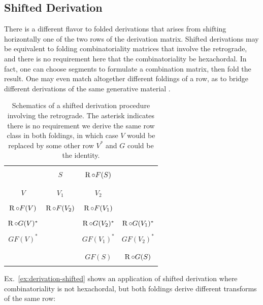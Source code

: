 \subsection{Shifted Derivation}

There is a different flavor to folded derivations that arises from shifting horizontally one of the two rows of the derivation matrix. Shifted derivations may be equivalent to folding combinatoriality matrices that involve the retrograde, and there is no requirement here that the combinatoriality be hexachordal. In fact, one can choose segments to formulate a combination matrix, then fold the result. One may even match altogether different foldings of a row, as to bridge different derivations of the same generative material \cite[216]{Starr1984}.

\begin{table}[htbp]
    \caption[Shifted Derivation Involving the Retrograde]{Schematics of a shifted derivation procedure involving the retrograde. The asterisk indicates there is no requirement we derive the same row class in both foldings, in which case $V$ would be replaced by some other row $V^*$ and $G$ could be the identity.}
    \label{derivation-shifted}
    \centering
    \vspace{12pt}
    \begin{tabular}{ c | c c c }
        \hline\\
        & $S$ & $\operatorname{R} \circ F(S)$ & \\\\
        \hline\\
        $V$ & $V_1$ & $V_2$ & \\\\
        $\operatorname{R} \circ F(V)$ & $\operatorname{R} \circ F(V_2)$ & $\operatorname{R} \circ F(V_1)$ & \\\\
        $\operatorname{R} \circ G(V)^*$ && $\operatorname{R} \circ G(V_2)^*$ & $\operatorname{R} \circ G(V_1)^*$ \\\\
        $GF(V)^*$ && $GF(V_1)^*$ & $GF(V_2)^*$ \\\\
        \hline\\
        && $GF(S)$ & $\operatorname{R} \circ G(S)$ \\\\
        \hline
    \end{tabular}
\end{table}

Ex.~\ref{ex:derivation-shifted} shows an application of shifted derivation where combinatoriality is not hexachordal, but both foldings derive different transforms of the same row:

